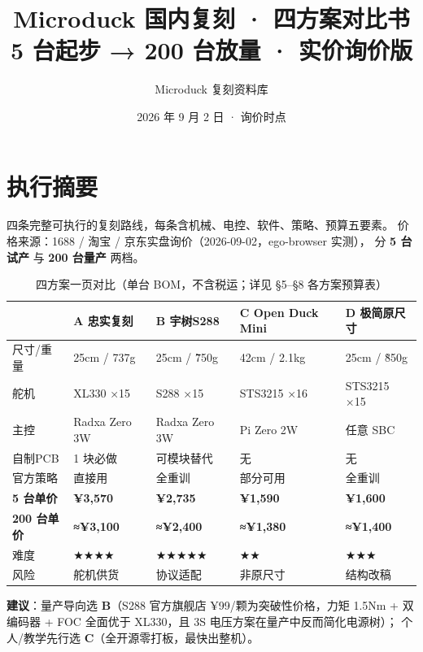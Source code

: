 \documentclass[11pt,a4paper]{ctexart}
\title{\textbf{Microduck 国内复刻 · 四方案对比书}\\[4pt]\large 5 台起步 → 200 台放量 · 实价询价版}
\author{Microduck 复刻资料库}
\date{2026 年 9 月 2 日 · 询价时点}
\begin{document}
\maketitle
\tableofcontents
\newpage

\section{执行摘要}

四条完整可执行的复刻路线，每条含机械、电控、软件、策略、预算五要素。
价格来源：1688 / 淘宝 / 京东实盘询价（2026-09-02，ego-browser 实测），
分 \textbf{5 台试产} 与 \textbf{200 台量产} 两档。

\begin{table}[h]
\centering\small
\begin{tabular}{@{}L{2.4cm}L{3.1cm}L{3.1cm}L{3.1cm}L{3.1cm}@{}}
\toprule
{} & \textbf{A 忠实复刻} & \textbf{B 宇树S288} & \textbf{C Open Duck Mini} & \textbf{D 极简原尺寸}\\
\midrule
尺寸/重量 & 25cm / 737g & 25cm / \~750g & 42cm / 2.1kg & 25cm / \~850g\\
舵机 & XL330 ×15 & S288 ×15 & STS3215 ×16 & STS3215 ×15\\
主控 & Radxa Zero 3W & Radxa Zero 3W & Pi Zero 2W & 任意 SBC\\
自制PCB & 1 块必做 & 可模块替代 & 无 & 无\\
官方策略 & 直接用 & 全重训 & 部分可用 & 全重训\\
\textbf{5 台单价} & \textbf{¥3{,}570} & \textbf{¥2{,}735} & \textbf{¥1{,}590} & \textbf{¥1{,}600}\\
\textbf{200 台单价} & \textbf{≈¥3{,}100} & \textbf{≈¥2{,}400} & \textbf{≈¥1{,}380} & \textbf{≈¥1{,}400}\\
\midrule
难度 & ★★★★ & ★★★★★ & ★★ & ★★★\\
风险 & 舵机供货 & 协议适配 & 非原尺寸 & 结构改稿\\
\bottomrule
\end{tabular}
\caption{四方案一页对比（单台 BOM，不含税运；详见 §5--§8 各方案预算表）}
\end{table}

\textbf{建议}：量产导向选 \textbf{B}（S288 官方旗舰店 ¥99/颗为突破性价格，力矩 1.5Nm +
双编码器 + FOC 全面优于 XL330，且 3S 电压方案在量产中反而简化电源树）；
个人/教学先行选 \textbf{C}（全开源零打板，最快出整机）。

\end{document}
